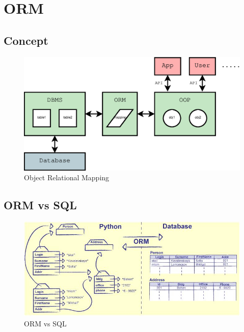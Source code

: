 \documentclass{beamer}
\begin{document}
\section{ORM} %

\subsection{Concept}

\begin{frame}
  \begin{figure}
    \centering
    \includegraphics[width=1.05\linewidth]{orm}
    \caption{Object Relational Mapping}
  \end{figure}
\end{frame}

\subsection{ORM vs SQL} %

\begin{frame}
  \begin{figure}
    \centering
    \includegraphics[width=1.05\linewidth]{orm_vs_sql}
    \caption{ORM vs SQL}
  \end{figure}
\end{frame}
\end{document}
